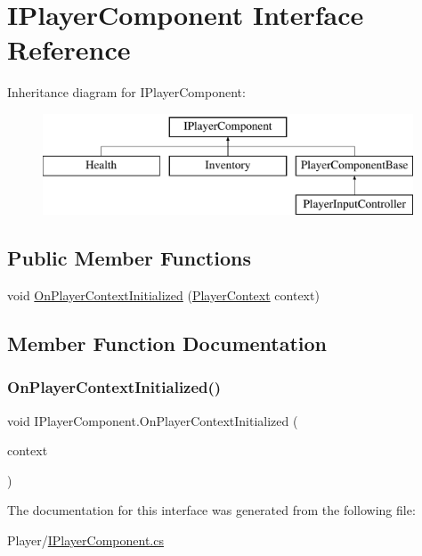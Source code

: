 \hypertarget{interface_i_player_component}{}\section{I\+Player\+Component Interface Reference}
\label{interface_i_player_component}
Inheritance diagram for I\+Player\+Component\+:\begin{figure}[H]
\begin{center}
\leavevmode
\includegraphics[height=3.000000cm]{interface_i_player_component}
\end{center}
\end{figure}
\subsection*{Public Member Functions}
\begin{DoxyCompactItemize}
\item 
void \mbox{\hyperlink{interface_i_player_component_ace4cab61651039e4ebf55e242a420555}{On\+Player\+Context\+Initialized}} (\mbox{\hyperlink{class_player_context}{Player\+Context}} context)
\end{DoxyCompactItemize}


\subsection{Member Function Documentation}
\mbox{\label{interface_i_player_component_ace4cab61651039e4ebf55e242a420555}} 
\subsubsection{\texorpdfstring{On\+Player\+Context\+Initialized()}{OnPlayerContextInitialized()}}
{\footnotesize\ttfamily void I\+Player\+Component.\+On\+Player\+Context\+Initialized (\begin{DoxyParamCaption}\item[{\mbox{\hyperlink{class_player_context}{Player\+Context}}}]{context }\end{DoxyParamCaption})}



The documentation for this interface was generated from the following file\+:\begin{DoxyCompactItemize}
\item 
Player/\mbox{\hyperlink{_i_player_component_8cs}{I\+Player\+Component.\+cs}}\end{DoxyCompactItemize}
